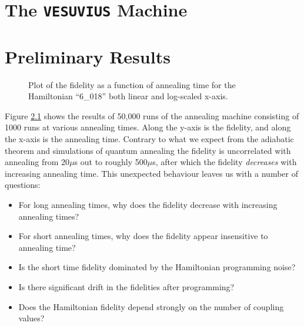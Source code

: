 \documentclass[12pt]{dalthesis}
\begin{document}
\chapter{The \texttt{VESUVIUS} Machine}

\chapter{Preliminary Results}

\begin{figure}[h]
	\caption[Fidelity vs Time]{Plot of the fidelity as a function of annealing time for the Hamiltonian ``6\_018'' both linear and log-scaled x-axis.}
	\label{fig:fidelity}
\end{figure}

Figure \ref{fig:fidelity} shows the results of 50,000 runs of the annealing machine consisting of 1000 runs at various annealing times.  Along the y-axis is the fidelity, and along the x-axis is the annealing time.  Contrary to what we expect from the adiabatic theorem and simulations of quantum annealing the fidelity is uncorrelated with annealing from 20$\mu$s out to roughly 500$ \mu$s, after which the fidelity \emph{decreases} with increasing annealing time.  This unexpected behaviour leaves us with a number of questions:

\begin{itemize}
	\item For long annealing times, why does the fidelity decrease with increasing annealing times?
	\item For short annealing times, why does the fidelity appear insensitive to annealing time?
	\item Is the short time fidelity dominated by the Hamiltonian programming noise?
	\item Is there significant drift in the fidelities after programming?
	\item Does the Hamiltonian fidelity depend strongly on the number of coupling values?
\end{itemize}
\end{document}
